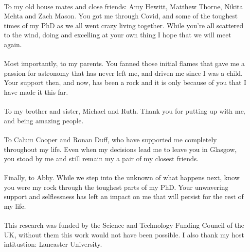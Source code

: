 \begin{acknowledgements}
\\
To my old house mates and close friends: Amy Hewitt, Matthew Thorne, Nikita Mehta and Zach Mason. You got me through Covid, and some of the toughest times of my PhD as we all went crazy living together. While you're all scattered to the wind, doing and excelling at your own thing I hope that we will meet again.
\\
\\
Most importantly, to my parents. You fanned those initial flames that gave me a passion for astronomy that has never left me, and driven me since I was a child. Your support then, and now, has been a rock and it is only because of you that I have made it this far.
\\
\\
To my brother and sister, Michael and Ruth. Thank you for putting up with me, and being amazing people.
\\
\\
To Calum Cooper and Ronan Duff, who have supported me completely throughout my life. Even when my decisions lead me to leave you in Glasgow, you stood by me and still remain my a pair of my closest friends.
\\
\\
Finally, to Abby. While we step into the unknown of what happens next, know you were my rock through the toughest parts of my PhD. Your unwavering support and selflessness has left an impact on me that will persist for the rest of my life.
\\
\\
This research was funded by the Science and Technology Funding Council of the UK, without them this work would not have been possible. I also thank my host intitustion: Lancaster University.




\end{acknowledgements}



